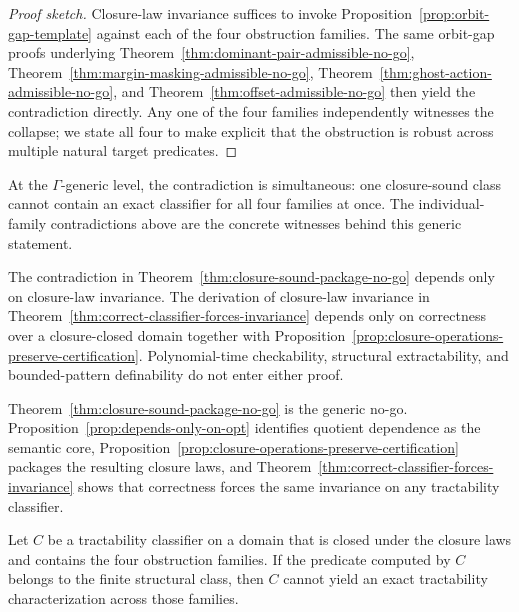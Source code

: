 \begin{proof}[Proof sketch]
Closure-law invariance suffices to invoke Proposition~\ref{prop:orbit-gap-template} against each of the four obstruction families. The same orbit-gap proofs underlying Theorem~\ref{thm:dominant-pair-admissible-no-go}, Theorem~\ref{thm:margin-masking-admissible-no-go}, Theorem~\ref{thm:ghost-action-admissible-no-go}, and Theorem~\ref{thm:offset-admissible-no-go} then yield the contradiction directly. Any one of the four families independently witnesses the collapse; we state all four to make explicit that the obstruction is robust across multiple natural target predicates.
\end{proof}

At the $\Gamma$-generic level, the contradiction is simultaneous: one closure-sound class cannot contain an exact classifier for all four families at once. The individual-family contradictions above are the concrete witnesses behind this generic statement.

\begin{remark}\label{prop:logical-dependency-no-go}
The contradiction in Theorem~\ref{thm:closure-sound-package-no-go} depends only on closure-law invariance. The derivation of closure-law invariance in Theorem~\ref{thm:correct-classifier-forces-invariance} depends only on correctness over a closure-closed domain together with Proposition~\ref{prop:closure-operations-preserve-certification}. Polynomial-time checkability, structural extractability, and bounded-pattern definability do not enter either proof.
\end{remark}

Theorem~\ref{thm:closure-sound-package-no-go} is the generic no-go. Proposition~\ref{prop:depends-only-on-opt} identifies quotient dependence as the semantic core, Proposition~\ref{prop:closure-operations-preserve-certification} packages the resulting closure laws, and Theorem~\ref{thm:correct-classifier-forces-invariance} shows that correctness forces the same invariance on any tractability classifier.

\begin{corollary}\label{cor:no-correct-tractability-classifier}
Let $C$ be a tractability classifier on a domain that is closed under the closure laws and contains the four obstruction families. If the predicate computed by $C$ belongs to the finite structural class, then $C$ cannot yield an exact tractability characterization across those families.
\end{corollary}

